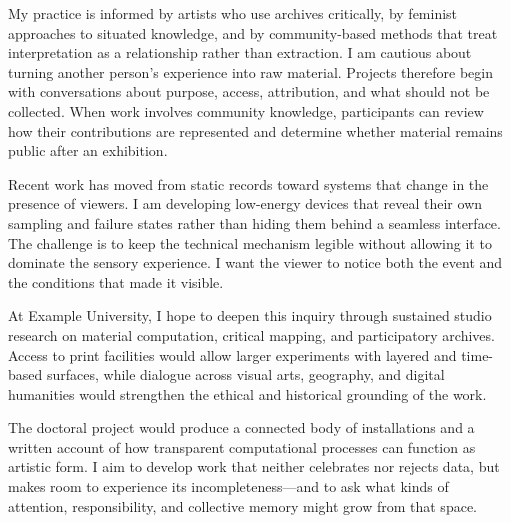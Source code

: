\documentclass[type=artist]{careerdossier-statement}
\begin{document}

My practice is informed by artists who use archives critically, by feminist
approaches to situated knowledge, and by community-based methods that treat
interpretation as a relationship rather than extraction. I am cautious about
turning another person's experience into raw material. Projects therefore begin
with conversations about purpose, access, attribution, and what should not be
collected. When work involves community knowledge, participants can review how
their contributions are represented and determine whether material remains
public after an exhibition.

Recent work has moved from static records toward systems that change in the
presence of viewers. I am developing low-energy devices that reveal their own
sampling and failure states rather than hiding them behind a seamless interface.
The challenge is to keep the technical mechanism legible without allowing it to
dominate the sensory experience. I want the viewer to notice both the event and
the conditions that made it visible.


At Example University, I hope to deepen this inquiry through sustained studio
research on material computation, critical mapping, and participatory archives.
Access to print facilities would allow larger experiments with layered and
time-based surfaces, while dialogue across visual arts, geography, and digital
humanities would strengthen the ethical and historical grounding of the work.

The doctoral project would produce a connected body of installations and a
written account of how transparent computational processes can function as
artistic form. I aim to develop work that neither celebrates nor rejects data,
but makes room to experience its incompleteness---and to ask what kinds of
attention, responsibility, and collective memory might grow from that space.
\end{document}

